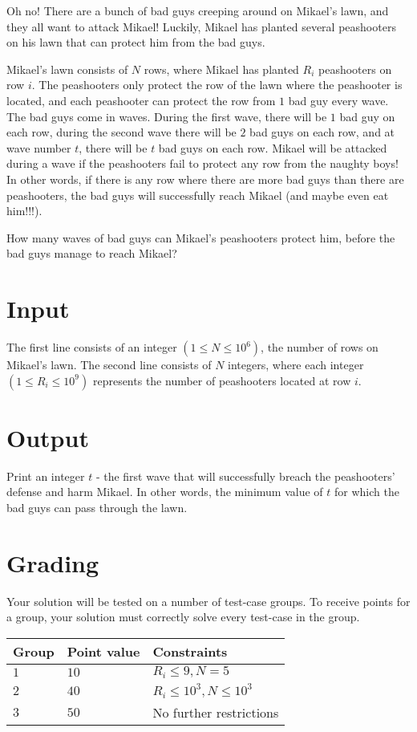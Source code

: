 \noindent
Oh no! There are a bunch of bad guys creeping around on Mikael's lawn, and they all want to attack Mikael! 
Luckily, Mikael has planted several peashooters on his lawn that can protect him from the bad guys.

\noindent
Mikael's lawn consists of $N$ rows, where Mikael has planted $R_i$ peashooters on row $i$. The peashooters only protect the row of the lawn where the peashooter is located, and each peashooter can protect the row from $1$ bad guy every wave.
The bad guys come in waves. During the first wave, there will be $1$ bad guy on each row, during the second wave there will be $2$ bad guys on each row, and at wave number $t$, there will be $t$ bad guys on each row.
Mikael will be attacked during a wave if the peashooters fail to protect any row from the naughty boys! 
In other words, if there is any row where there are more bad guys than there are peashooters, the bad guys will successfully reach Mikael (and maybe even eat him!!!).

\noindent
How many waves of bad guys can Mikael's peashooters protect him, before the bad guys manage to reach Mikael?


\section*{Input}
\noindent
The first line consists of an integer $(1 \leqslant N \leqslant 10^6)$, the number of rows on Mikael's lawn.
The second line consists of $N$ integers, where each integer $(1 \leqslant R_i \leqslant 10^9)$ represents the number of peashooters located at row $i$.


\section*{Output}
\noindent
Print an integer $t$ - the first wave that will successfully breach the peashooters' defense and harm Mikael. 
In other words, the minimum value of $t$ for which the bad guys can pass through the lawn.


\section*{Grading}
\noindent
Your solution will be tested on a number of test-case groups.
To receive points for a group, your solution must correctly solve every test-case in the group.

\noindent
\begin{tabular}{| l | l | l |}
\hline
  Group & Point value & Constraints \\ \hline
  $1$    & $10$       &  $R_i \leqslant 9, N = 5$ \\ \hline
  $2$    & $40$       &  $R_i \leqslant 10^3, N \leqslant 10^3$ \\ \hline
  $3$    & $50$       &  No further restrictions \\ \hline
\end{tabular}
